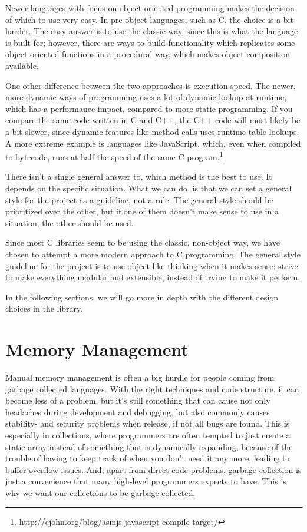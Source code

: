 \documentclass[table]{ituthesis}
\begin{document}
Newer languages with focus on object oriented programming makes the decision of which to use very easy. In pre-object languages, such as C, the choice is a bit harder. The easy answer is to use the classic way, since this is what the language is built for; however, there are ways to build functionality which replicates some object-oriented functions in a procedural way, which makes object composition available.

One other difference between the two approaches is execution speed. The newer, more dynamic ways of programming uses a lot of dynamic lookup at runtime, which has a performance impact, compared to more static programming. If you compare the same code written in C and C++, the C++ code will most likely be a bit slower, since dynamic features like method calls uses runtime table lookups. A more extreme example is languages like JavaScript, which, even when compiled to bytecode, runs at half the speed of the same C program.\footnote{http://ejohn.org/blog/asmjs-javascript-compile-target/}

There isn't a single general answer to, which method is the best to use. It depends on the specific situation. What we can do, is that we can set a general style for the project as a guideline, not a rule. The general style should be prioritized over the other, but if one of them doesn't make sense to use in a situation, the other should be used.

Since most C libraries seem to be using the classic, non-object way, we have chosen to attempt a more modern approach to C programming. The general style guideline for the project is to use object-like thinking when it makes sense: strive to make everything modular and extensible, instead of trying to make it perform.

In the following sections, we will go more in depth with the different design choices in the library.

\section{Memory Management}\label{sec:arch_memory_management}

Manual memory management is often a big hurdle for people coming from garbage collected languages. With the right techniques and code structure, it can become less of a problem, but it's still something that can cause not only headaches during development and debugging, but also commonly causes stability- and security problems when release, if not all bugs are found. This is especially in collections, where programmers are often tempted to just create a static array instead of something that is dynamically expanding, because of the trouble of having to keep track of when you don't need it any more, leading to buffer overflow issues. And, apart from direct code problems, garbage collection is just a convenience that many high-level programmers expects to have. This is why we want our collections to be garbage collected.
\end{document}
